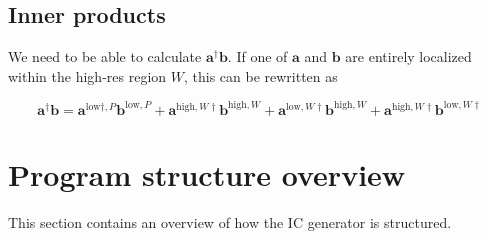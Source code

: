 \documentclass[11pt,a4paper,preprint]{aastex}
\newcommand{\low}{\mathrm{low}}
\newcommand{\high}{\mathrm{high}}
\newcommand{\bmath}[1]{\ensuremath{\bm{#1}}}
\renewcommand{\vec}[1]{\bmath{#1}}
\begin{document}
\subsection{Inner products}

We need to be able to calculate $\vec{a}^{\dagger} \vec{b}$. If one of $\vec{a}$ and $\vec{b}$ are
entirely localized within the high-res region $W$, this can be rewritten as

\begin{equation}
    \vec{a}^{\dagger} \vec{b} = \vec{a}^{\low\dagger,P}
    \vec{b}^{\low,P} + \vec{a}^{\high,W\dagger} \vec{b}^{\high,W} +
    \vec{a}^{\low,W\dagger} \vec{b}^{\high,W} +
    \vec{a}^{\high,W\dagger} \vec{b}^{\low,W\dagger}
\end{equation}


\section{Program structure overview}

This section contains an overview of how the IC generator is structured.
\end{document}
